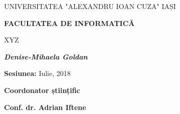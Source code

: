 \begin{center}
	\large{UNIVERSITATEA "ALEXANDRU IOAN CUZA" IAȘI} \\
	\vspace{0.4cm}
	
	\large{\textbf{FACULTATEA DE INFORMATICĂ}} \\
    \vspace{4cm}
    
	\LARGE{XYZ} \\
	\vspace{3cm}
	
	\large{\textbf{\textit{Denise-Mihaela Goldan}}}\\
	\vspace{3cm}
	
	\large{\textbf{Sesiunea:} Iulie, 2018}\\
	\vspace{3cm}
	
	\large{\textbf{Coordonator științific}}\\
	\vspace{0.4cm}
	
	\large{\textbf{Conf. dr. Adrian Iftene}}
\end{center}

\clearpage